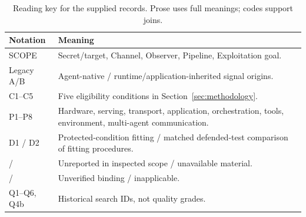 \begin{table}[!ht]\centering\footnotesize
\caption{Reading key for the supplied records. Prose uses full meanings; codes support joins.}\label{tab:notation}
\begin{tabularx}{\columnwidth}{@{}p{}Y@{}}\toprule
Notation & Meaning\\\midrule
SCOPE & Secret/target, Channel, Observer, Pipeline, Exploitation goal.\\
Legacy A/B & Agent-native / runtime/application-inherited signal origins.\\
C1--C5 & Five eligibility conditions in Section~\ref{sec:methodology}.\\
P1--P8 & Hardware, serving, transport, application, orchestration, tools, environment, multi-agent communication.\\
D1 / D2 & Protected-condition fitting / matched defended-test comparison of fitting procedures.\\
\NRR{} / \NRA{} & Unreported in inspected scope / unavailable material.\\
\NRV{} / \NA{} & Unverified binding / inapplicable.\\
Q1--Q6, Q4b & Historical search IDs, not quality grades.\\\bottomrule
\end{tabularx}\end{table}
